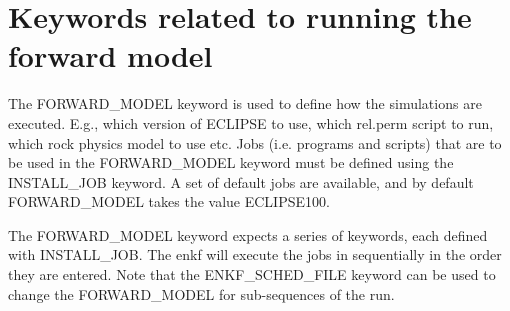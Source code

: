 \documentclass[letterpaper,10pt,english]{sphinxmanual}
\begin{document}
\section{Keywords related to running the forward model}
\label{\detokenize{keywords/index:keywords-related-to-running-the-forward-model}}\label{\detokenize{keywords/index:id12}}\label{\detokenize{keywords/index:forward-model}}
\begin{sphinxShadowBox}

The FORWARD\_MODEL keyword is used to define how the simulations are executed.
E.g., which version of ECLIPSE to use, which rel.perm script to run, which
rock physics model to use etc. Jobs (i.e. programs and scripts) that are to be
used in the FORWARD\_MODEL keyword must be defined using the INSTALL\_JOB
keyword. A set of default jobs are available, and by default FORWARD\_MODEL
takes the value ECLIPSE100.

The FORWARD\_MODEL keyword expects a series of keywords, each defined with
INSTALL\_JOB. The enkf will execute the jobs in sequentially in the order they
are entered. Note that the ENKF\_SCHED\_FILE keyword can be used to change the
FORWARD\_MODEL for sub-sequences of the run.


%
\begin{sphinxVerbatim}[commandchars=\\\{\}]
       
       
   
  
\end{sphinxVerbatim}



\end{sphinxShadowBox}
\end{document}
